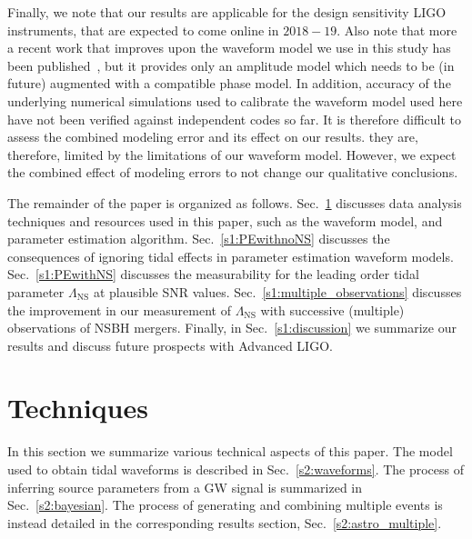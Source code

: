 \documentclass[aps,prd,amsmath,floats,floatfix, twocolumn,
superscriptaddress,nofootinbib,showpacs]{revtex4-1}
\newcommand{\lambdans}{\Lambda_\mathrm{NS}}
\begin{document}
Finally, we note that our results are applicable for the design sensitivity
LIGO instruments, that are expected to come online in $2018-19$. Also note
that more a recent work that improves upon the waveform model we use in this
study has been published~\cite{Pannarale:2015jka}, but it provides only an 
amplitude model which needs to be (in future) augmented with a compatible
phase model. In addition, accuracy of the underlying numerical simulations 
used to calibrate the waveform model used here have not been verified against 
independent codes so far.
It is therefore difficult to assess the combined modeling error and its effect
on our results. they are, therefore, limited by the limitations of our
waveform model. However, we expect the combined effect of modeling errors to
not change our qualitative conclusions.




The remainder of the paper is organized as follows. 
Sec.~\ref{s1:techniques} discusses data analysis techniques and resources 
used in this paper, such as the waveform model, and parameter estimation 
algorithm.
Sec.~\ref{s1:PEwithnoNS} discusses the consequences of ignoring tidal 
effects in parameter estimation waveform models.
Sec.~\ref{s1:PEwithNS} discusses the measurability for the leading order
tidal parameter $\lambdans$ at plausible SNR values.
Sec.~\ref{s1:multiple_observations} discusses the improvement in our
measurement of $\lambdans$ with successive (multiple) observations of
NSBH mergers.
Finally, in Sec.~\ref{s1:discussion} we summarize our results and discuss
future prospects with Advanced LIGO.





\section{Techniques}\label{s1:techniques}

In this section we summarize various technical aspects of this paper. The model
used to obtain tidal waveforms is described in Sec.~\ref{s2:waveforms}. The 
process of inferring source parameters from a GW signal is summarized in 
Sec.~\ref{s2:bayesian}. The process of generating and combining multiple events
is instead detailed in the corresponding results section,
Sec.~\ref{s2:astro_multiple}.
\end{document}
